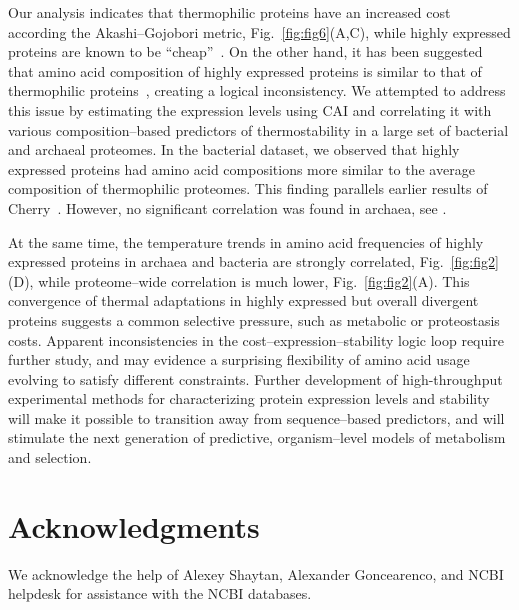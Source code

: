 \documentclass[10pt,letterpaper]{article}
\begin{document}
Our analysis indicates that thermophilic proteins have an increased cost according the Akashi--Gojobori metric, Fig.~\ref{fig:fig6}(A,C), while highly expressed proteins are known to be ``cheap''~\cite{Akashi2002Metabolic}. On the other hand, it has been suggested that amino acid composition of highly expressed proteins is similar to that of thermophilic proteins~\cite{Cherry2010Highly}, creating a logical inconsistency. We attempted to address this issue by estimating the expression levels using CAI and correlating it with various composition--based predictors of thermostability in a large set of bacterial and archaeal proteomes. In the bacterial dataset, we observed that highly expressed proteins had amino acid compositions more similar to the average composition of thermophilic proteomes. This finding parallels earlier results of Cherry~\cite{Cherry2010Highly}. However, no significant correlation was found in archaea, see . 

At the same time, the temperature trends in amino acid frequencies of highly expressed proteins in archaea and bacteria are strongly correlated, Fig.~\ref{fig:fig2}(D), while proteome--wide correlation is much lower, Fig.~\ref{fig:fig2}(A). This convergence of thermal adaptations in highly expressed but overall divergent proteins suggests a common selective pressure, such as metabolic or proteostasis costs. Apparent inconsistencies in the cost--expression--stability logic loop require further study, and may evidence a surprising flexibility of amino acid usage evolving to satisfy different constraints. Further development of high-throughput experimental methods for characterizing protein expression levels and stability will make it possible to transition away from sequence--based predictors, and will stimulate the next generation of predictive, organism--level models of metabolism and selection.





\section*{Acknowledgments}

We acknowledge the help of Alexey Shaytan, Alexander Goncearenco, and NCBI helpdesk for assistance with the NCBI databases.
\end{document}
